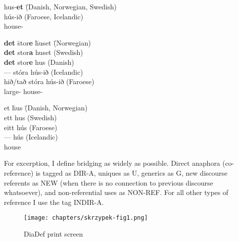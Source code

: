 \documentclass[output=paper]{langsci/langscibook}
\begin{document}
\begin{exe}
\ex\label{6ex:16}
\begin{tabbing}
hus-{\bf{et}}\hspace*{5.2cm} \= (Danish, Norwegian, Swedish) \\
hús-ið \> (Faroese, Icelandic) \\
house-{} 
\end{tabbing}

\ex\label{6ex:17}
\begin{tabbing}
{\bf{det}}\hspace*{1.3cm} \= 	stor{\bf{e}}\hspace*{1.3cm} \= huset\hspace*{1.3cm} \= (Norwegian) \\
{\bf{det}}  \> stor{\bf{a}} \> huset \> (Swedish) \\
{\bf{det}} \> stor{\bf{e}} \> hus \> (Danish) \\
--- \> stóra \> hús-ið \> (Icelandic) \\
hið/tað \> stóra \> hús-ið \> (Faroese) \\
{} \> large-{} \> house-{} 
\end{tabbing}

\ex\label{6ex:18}
\begin{tabbing}
et\hspace*{1.52cm} \= hus\hspace*{3.8cm} \= (Danish, Norwegian) \\
ett \> hus \> (Swedish) \\
eitt \> hús \> (Faroese) \\
--- \> hús \> (Icelandic) \\
{} \> house
\end{tabbing}
\end{exe}

For excerption, I define bridging as widely as possible. Direct anaphora (co-reference) is tagged as DIR-A, uniques as U, generics as G, new discourse referents as NEW (when there is no connection to previous discourse whatsoever), and non-referential uses as NON-REF. For all other types of reference I use the tag INDIR-A.

\begin{figure}[H]
\centering
\texttt{[image: chapters/skrzypek-fig1.png]}
\caption{DiaDef print screen}\label{6fig:1}
\end{figure}
\end{document}
